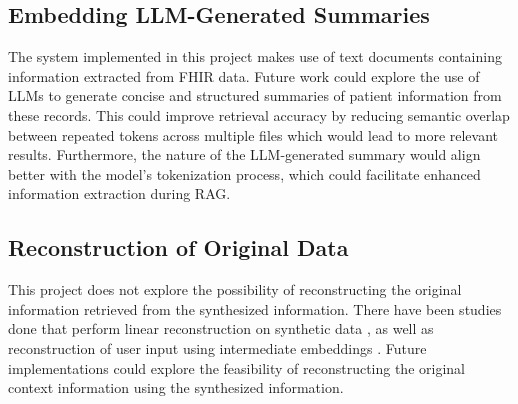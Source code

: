 \subsection{Embedding LLM-Generated Summaries}
The system implemented in this project makes use of text documents containing information extracted from FHIR data.
Future work could explore the use of LLMs to generate concise and structured summaries of patient information from these records.
This could improve retrieval accuracy by reducing semantic overlap between repeated tokens across multiple files which would lead to more relevant results.
Furthermore, the nature of the LLM-generated summary would align better with the model's tokenization process, which could facilitate enhanced information extraction during RAG.

\subsection{Reconstruction of Original Data}
This project does not explore the possibility of reconstructing the original information retrieved from the synthesized information. There have been studies done that perform linear reconstruction on synthetic data \autocite{annamalai2024linearreconstructionapproachattribute}, as well as reconstruction of user input using intermediate embeddings \autocite{zheng2023inputreconstructionattackvertical}. Future implementations could explore the feasibility of reconstructing the original context information using the synthesized information.
